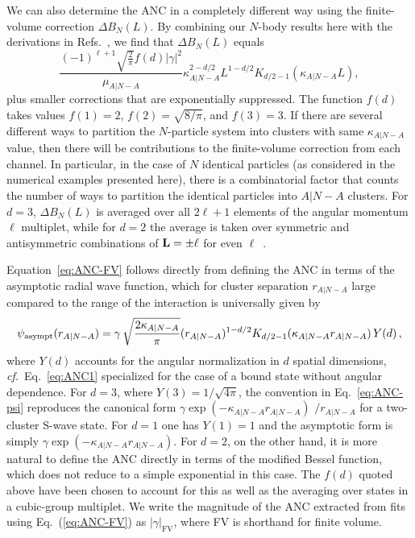 \documentclass[aps,singlecolumn,superscriptaddress,nofootinbib,tightenlines,
preprintnumbers,showkeys]{revtex4-1}
\newcommand{\cf}{\textit{cf.}\xspace}
\newcommand{\abs}[1]{\left|#1\right|}
\begin{document}
We can also determine the ANC in a completely different way using the 
finite-volume correction $\Delta B_N(L)$.  By combining our $N$-body results 
here with the derivations in 
Refs.~\cite{Luscher:1985dn,Konig:2011nz,Konig:2011ti}, we find that $\Delta 
B_N(L)$ equals
%
\begin{equation}
 \frac{(-1)^{\ell+1} \sqrt{\tfrac{2}{\pi}}
 f(d) \abs{\gamma}^2}{\mu_{A|N-A}}
 \kappa^{2-d/2}_{A|N-A}L^{1-d/2} K_{d/2-1}(\kappa_{A|N-A}L),
\label{eq:ANC-FV}
\end{equation}
%
plus smaller corrections that are exponentially suppressed.  The function $f(d)$
takes values $f(1)=2$, $f(2)=\sqrt{8/\pi}$, and $f(3)=3$.  If there are several
different ways to partition the $N$-particle system into clusters with same 
$\kappa_{A|N{-}A}$ value, then there will be contributions to the finite-volume 
correction from each channel.  In particular, in the case of $N$ identical 
particles (as considered in the numerical examples presented here), there is a 
combinatorial factor that counts the number of ways to partition the identical 
particles into $A|N{-}A$ clusters.  For $d=3$, $\Delta B_N(L)$ is averaged over 
all $2\ell +1$ elements of the angular momentum $\ell$ multiplet, while for 
$d=2$ the average is taken over symmetric and antisymmetric combinations of 
${\bf L} = \pm\ell$ for even $\ell$~\cite{Konig:2011ti}.

Equation~\eqref{eq:ANC-FV} follows directly from defining the ANC in terms of 
the asymptotic radial wave function, which for cluster separation $r_{A|N-A}$ 
large compared to the range of the interaction is universally given by
%
\begin{equation}
 \psi_{\text{asympt}}(r_{A|N-A})
 = \gamma \, \sqrt{\frac{2\kappa_{A|N-A}}{\pi}}
 (r_{A|N-A})^{1-d/2}
 \null K_{d/2-1}(\kappa_{A|N-A}r_{A|N-A}) \, Y(d) \,,
\label{eq:ANC-psi}
\end{equation}
%
where $Y(d)$ accounts for the angular normalization in $d$ spatial dimensions, 
\cf~Eq.~\eqref{eq:ANC1} specialized for the case of a bound state without 
angular dependence.  For $d=3$, where $Y(3) = 1/\sqrt{4\pi}$, the convention in 
Eq.~\eqref{eq:ANC-psi} reproduces the canonical form 
$\gamma\exp({-}\kappa_{A|N-A}r_{A|N-A})$ $/r_{A|N-A}$ for a two-cluster S-wave 
state.  For $d=1$ one has $Y(1) = 1$ and the asymptotic form is simply 
$\gamma\exp({-}\kappa_{A|N-A}r_{A|N-A})$.  For $d=2$, on the other hand, it is 
more natural to define the ANC directly in terms of the modified Bessel 
function, which does not reduce to a simple exponential in this case.  The 
$f(d)$ quoted above have been chosen to account for this as well as the
averaging over states in a cubic-group multiplet.  We write the magnitude of the 
ANC extracted from fits using Eq.~(\ref{eq:ANC-FV}) as 
$\abs{\gamma}_{\text{FV}}$, where FV is shorthand for finite volume.
\end{document}
